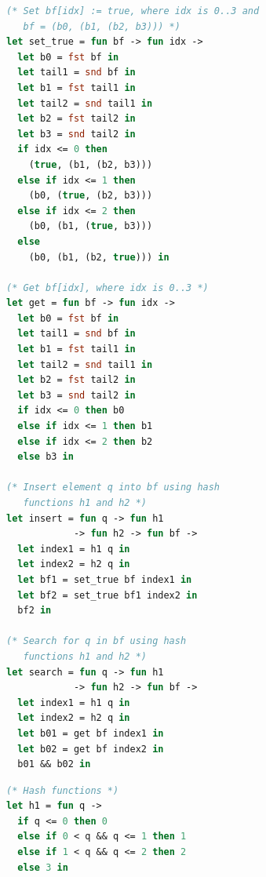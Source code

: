\begin{figure}[t]
    \centering
    \begin{minipage}[t]{0.46\textwidth}
    \vspace{0pt}
    \begin{lstlisting}[aboveskip=0.4em,belowskip=0.4em,
      language=OCaml,
      escapechar=!,
      numbers=right,
      stepnumber=1,
      numberstyle=\color{gray}\scriptsize,
      numbersep=7pt,
      basicstyle=\ttfamily\footnotesize,
      commentstyle=\color{ForestGreen}\itshape]
(* Set bf[idx] := true, where idx is 0..3 and
   bf = (b0, (b1, (b2, b3))) *)
let set_true = fun bf -> fun idx ->
  let b0 = fst bf in
  let tail1 = snd bf in
  let b1 = fst tail1 in
  let tail2 = snd tail1 in
  let b2 = fst tail2 in
  let b3 = snd tail2 in
  if idx <= 0 then
    (true, (b1, (b2, b3)))
  else if idx <= 1 then
    (b0, (true, (b2, b3)))
  else if idx <= 2 then
    (b0, (b1, (true, b3)))
  else
    (b0, (b1, (b2, true))) in

(* Get bf[idx], where idx is 0..3 *)
let get = fun bf -> fun idx ->
  let b0 = fst bf in
  let tail1 = snd bf in
  let b1 = fst tail1 in
  let tail2 = snd tail1 in
  let b2 = fst tail2 in
  let b3 = snd tail2 in
  if idx <= 0 then b0
  else if idx <= 1 then b1
  else if idx <= 2 then b2
  else b3 in

(* Insert element q into bf using hash
   functions h1 and h2 *)
let insert = fun q -> fun h1 
            -> fun h2 -> fun bf ->
  let index1 = h1 q in
  let index2 = h2 q in
  let bf1 = set_true bf index1 in
  let bf2 = set_true bf1 index2 in
  bf2 in

(* Search for q in bf using hash
   functions h1 and h2 *)
let search = fun q -> fun h1 
            -> fun h2 -> fun bf ->
  let index1 = h1 q in
  let index2 = h2 q in
  let b01 = get bf index1 in
  let b02 = get bf index2 in
  b01 && b02 in
    \end{lstlisting}
    \end{minipage}
    \hfill
    \hspace{-4pt}%
    \begin{minipage}[t]{0.46\textwidth}
    \vspace{0pt}
    \begin{lstlisting}[aboveskip=0.4em,belowskip=0.4em,
      language=OCaml,
      escapechar=!,
      numbers=right,
      stepnumber=1,
      firstnumber=last,
      numberstyle=\color{gray}\scriptsize,
      numbersep=7pt,
      basicstyle=\ttfamily\footnotesize,
      commentstyle=\color{ForestGreen}\itshape]
(* Hash functions *)
let h1 = fun q ->
  if q <= 0 then 0
  else if 0 < q && q <= 1 then 1
  else if 1 < q && q <= 2 then 2
  else 3 in


\end{lstlisting}
\end{minipage}
\end{figure}
